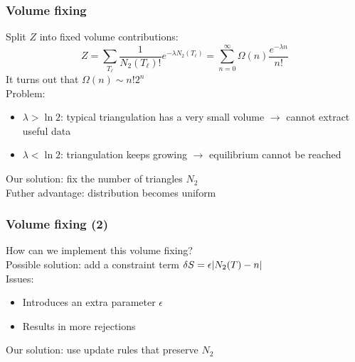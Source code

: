 
\begin{frame}
    \frametitle{Volume fixing}
    Split $Z$ into fixed volume contributions:
    \begin{equation}
        Z
        =
        \sum_{T_\ell} \frac{1}{N_2(T_\ell)!} e^{-\lambda N_2(T_\ell)}
        =
        \sum_{n = 0}^\infty \Omega(n) \frac{e^{-\lambda n}}{n!}
    \end{equation}
    It turns out that $\Omega(n) \sim n! 2^n$ \\
    Problem:
    \begin{itemize}
        \item $\lambda > \ln 2$: typical triangulation has a very small volume $\to$ cannot extract useful data
        \item $\lambda < \ln 2$: triangulation keeps growing $\to$ equilibrium cannot be reached
    \end{itemize}
    Our solution: fix the number of triangles $N_2$ \\
    Futher advantage: distribution becomes uniform
\end{frame}

\begin{frame}
    \frametitle{Volume fixing (2)}
    How can we implement this volume fixing? \\
    Possible solution: add a constraint term $\delta S = \epsilon \abs{N_2(T) - n}$ \\
    Issues:
    \begin{itemize}
        \item Introduces an extra parameter $\epsilon$
        \item Results in more rejections
    \end{itemize}
    Our solution: use update rules that preserve $N_2$
\end{frame}